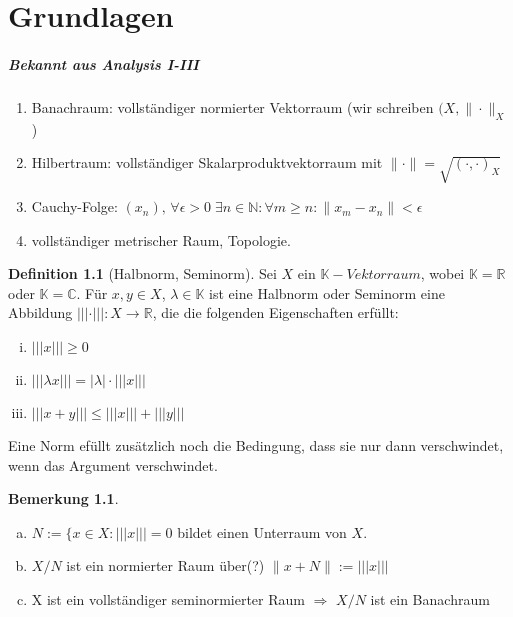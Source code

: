 \documentclass[ngerman]{report}
\theoremstyle{definition}%
\newtheorem{definition}[section]{Definition}
\newtheorem{bem}[section]{Bemerkung}
\newcommand{\C}{\mathbb{C}}
\newcommand{\R}{\mathbb{R}}
\newcommand{\N}{\mathbb{N}}
\newcommand{\K}{\mathbb{K}}
\newcommand{\seminorm}[1]{||| #1 |||}
\newcommand{\norm}[1]{\|#1\|}
\begin{document}
\chapter{Grundlagen}

\paragraph{Bekannt aus Analysis I-III}

\begin{enumerate}[-]
	\item Banachraum: vollständiger normierter Vektorraum (wir schreiben $(X,\norm{\cdot }_X$) 
	\item Hilbertraum: vollständiger Skalarproduktvektorraum mit $\norm{\cdot } = \sqrt{(\cdot , \cdot )_X}$ 
	\item Cauchy-Folge: 
					$(x_n),\,  \forall \epsilon > 0\; \exists n \in \N : \forall m \geq n : \norm{x_m-x_n}<\epsilon$
	\item vollständiger metrischer Raum, Topologie.
\end{enumerate}

\begin{definition}[Halbnorm, Seminorm]

	Sei $X$ ein $\K-Vektorraum$, wobei $\K = \R$ oder $\K = \C$. 
	Für $x,y\in X$, $\lambda \in \K$ ist eine Halbnorm oder Seminorm eine Abbildung
	$\seminorm{\cdot}:X \rightarrow \R$, die die folgenden Eigenschaften erfüllt:

		\begin{enumerate}[(i)]
			\item $\seminorm{x}\geq 0$
			\item $\seminorm{\lambda x} = |\lambda|\cdot \seminorm{x}$
			\item $\seminorm{x+y} \leq \seminorm{x} + \seminorm{y}$
		\end{enumerate}

\end{definition}

Eine Norm efüllt zusätzlich noch die Bedingung, dass sie nur dann verschwindet, wenn das Argument verschwindet.

\begin{bem}
	\begin{enumerate}[(a)]
		\item $N:=\{x\in X: \seminorm{x}=0$ bildet einen Unterraum von $X$.
		\item $X/N$ ist ein normierter Raum über(?) $\norm{x+N} := \seminorm{x}$
		\item X ist ein vollständiger seminormierter Raum $\Rightarrow$ $X/N$ ist ein Banachraum 
	\end{enumerate}
\end{bem}
\end{document}
